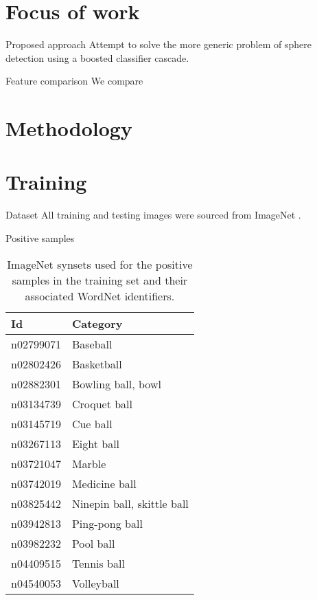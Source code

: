 \documentclass{beamer}
\begin{document}
\section{Focus of work}
	\begin{frame}{Proposed approach}
		Attempt to solve the more generic problem of sphere detection using a boosted classifier cascade.
	\end{frame}

	\begin{frame}{Feature comparison}
		We compare 
	\end{frame}

\section{Methodology}

\section{Training}

\begin{frame}{Dataset}
	All training and testing images were sourced from ImageNet \citep{imagenet_cvpr09}.
\end{frame}

\begin{frame}{Positive samples}
	\begin{table}[H]
		\footnotesize
		\centering
		\caption{ImageNet synsets used for the positive samples in the training set and their associated WordNet \citep{fellbaum1998wordnet} identifiers.}
		\label{tab:postraining}
		\begin{tabularx}{\textwidth}{lX}
			\toprule
			\textbf{Id} & \textbf{Category} \\
			\midrule
			n02799071 & Baseball \\
			n02802426 & Basketball \\
			n02882301 & Bowling ball, bowl \\
			n03134739 & Croquet ball \\
			n03145719 & Cue ball \\
			n03267113 & Eight ball \\
			n03721047 & Marble \\
			n03742019 & Medicine ball \\
			n03825442 & Ninepin ball, skittle ball \\
			n03942813 & Ping-pong ball \\
			n03982232 & Pool ball \\
			n04409515 & Tennis ball \\
			n04540053 & Volleyball \\
			\bottomrule
		\end{tabularx}
	\end{table}
\end{frame}
\end{document}

